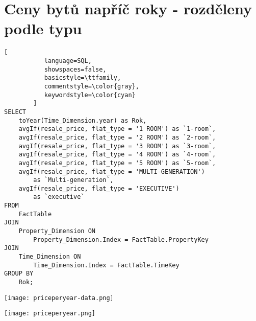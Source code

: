 \section{Ceny bytů napříč roky - rozděleny podle typu}

\begin{lstlisting}[
           language=SQL,
           showspaces=false,
           basicstyle=\ttfamily,
           commentstyle=\color{gray},
           keywordstyle=\color{cyan}
        ]
SELECT 
    toYear(Time_Dimension.year) as Rok, 
    avgIf(resale_price, flat_type = '1 ROOM') as `1-room`, 
    avgIf(resale_price, flat_type = '2 ROOM') as `2-room`, 
    avgIf(resale_price, flat_type = '3 ROOM') as `3-room`, 
    avgIf(resale_price, flat_type = '4 ROOM') as `4-room`, 
    avgIf(resale_price, flat_type = '5 ROOM') as `5-room`, 
    avgIf(resale_price, flat_type = 'MULTI-GENERATION') 
        as `Multi-generation`, 
    avgIf(resale_price, flat_type = 'EXECUTIVE') 
        as `executive` 
FROM 
    FactTable 
JOIN 
    Property_Dimension ON 
        Property_Dimension.Index = FactTable.PropertyKey 
JOIN 
    Time_Dimension ON 
        Time_Dimension.Index = FactTable.TimeKey 
GROUP BY 
    Rok;
\end{lstlisting}

\texttt{[image: priceperyear-data.png]}

\texttt{[image: priceperyear.png]}

